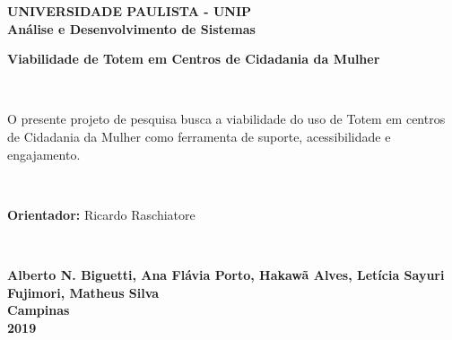 \thispagestyle{empty}
\begin{center}
\normalsize{\textbf{UNIVERSIDADE PAULISTA - UNIP}}\\[0.3pc]
\normalsize{\textbf{Análise e Desenvolvimento de Sistemas}}\\[8pc]
\parbox{10cm}{\begin{center}\normalsize{\textbf{Viabilidade de Totem em Centros de Cidadania da Mulher}}\end{center}}\\
\end{center}
\par
\vspace{30pt}
\hspace*{130pt}\parbox{10cm}{{\normalsize O presente projeto de pesquisa busca a viabilidade do uso de Totem em centros de Cidadania da Mulher como ferramenta de suporte, acessibilidade e engajamento.}}\\[1pc]

\noindent\hspace*{165pt}\parbox{10cm}{{\normalsize \textbf{Orientador:} Ricardo Raschiatore}}\\[1pc]
\begin{center}
\vspace{50pt}
\normalsize{\textbf{Alberto N. Biguetti, Ana Flávia Porto, Hakawã Alves, Letícia Sayuri Fujimori, Matheus Silva}}\\[1pc]%
\vfill
\normalsize{\textbf{Campinas}}\\[1pc]
\normalsize{\textbf{2019}}
\end{center}
\newpage 